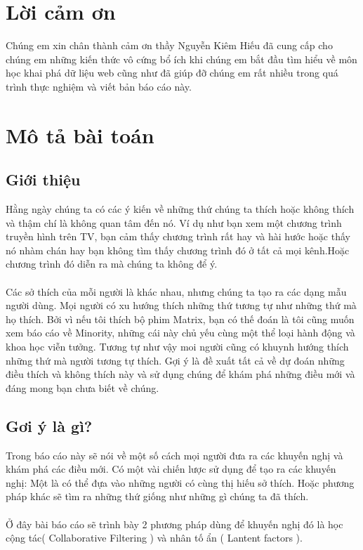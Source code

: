 \documentclass[a4paper,11pt]{report}
\begin{document}
\chapter*{Lời cảm ơn}
Chúng em xin chân thành cảm ơn thầy Nguyễn Kiêm Hiếu đã cung cấp cho chúng em những kiến thức vô cứng bổ ích khi chúng em bắt đầu tìm hiểu về môn học khai phá dữ liệu web cũng như đã giúp đỡ chúng em rất nhiều trong quá trình thực nghiệm và viết bản báo cáo này.
\chapter{Mô tả bài toán}
\section{Giới thiệu}
Hằng ngày chúng ta có các ý kiến về những thứ chúng ta thích hoặc không thích và thậm chí là không quan tâm đến nó. Ví dụ như bạn xem một chương trình truyền hình trên TV, bạn cảm thấy chương trình rất hay và hài hước hoặc thấy nó nhàm chán hay bạn không tìm thấy chương trình đó ở tất cả mọi kênh.Hoặc chương trình đó diễn ra mà chúng ta không để ý.\\ \\
Các sở thích của mỗi người là khác nhau, nhưng chúng ta tạo ra các dạng mẫu người dùng. Mọi người có xu hướng thích những thứ tương tự như những thứ mà họ thích. Bởi vì nếu tôi thích bộ phim Matrix, bạn có thế đoán là tôi cũng muốn xem báo cáo về  Minority, những cái này chủ yếu cùng một thể loại hành động và khoa học viễn tưởng. Tương tự như vậy moi người cũng có khuynh hướng thích những thứ mà người tương tự thích. Gợi ý là đề xuất tất cả về dự đoán những điều thích và không thích này và sử dụng chúng để khám phá những điều mới và đáng mong bạn chưa biết về chúng.
\section{Gơi ý là gì?}
Trong báo cáo này sẽ nói về một số cách mọi người đưa ra các khuyến nghị và khám phá các điều mới. Có một vài chiến lược sử dụng để tạo ra các khuyến nghị: Một là có thể đựa vào những người có cùng thị hiếu sở thích. Hoặc phương pháp khác sẽ tìm ra những thứ giống như những gì chúng ta đã thích.\\ \\
Ở đây bài báo cáo sẽ trình bày 2 phương pháp dùng để khuyến nghị đó là học cộng tác( Collaborative Filtering ) và nhân tố ẩn ( Lantent factors ).
\newpage
\end{document}
